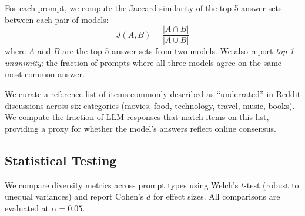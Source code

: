  For each prompt, we compute the Jaccard similarity of the top-5 answer sets between each pair of models:
\begin{equation}
    J(A, B) = \frac{|A \cap B|}{|A \cup B|}
    \label{eq:jaccard}
\end{equation}
where $A$ and $B$ are the top-5 answer sets from two models. We also report \emph{top-1 unanimity}: the fraction of prompts where all three models agree on the same most-common answer.

 We curate a reference list of items commonly described as ``underrated'' in Reddit discussions across six categories (movies, food, technology, travel, music, books). We compute the fraction of LLM responses that match items on this list, providing a proxy for whether the model's answers reflect online consensus.

\subsection{Statistical Testing}

We compare diversity metrics across prompt types using Welch's $t$-test (robust to unequal variances) and report Cohen's $d$ for effect sizes. All comparisons are evaluated at $\alpha = 0.05$.
